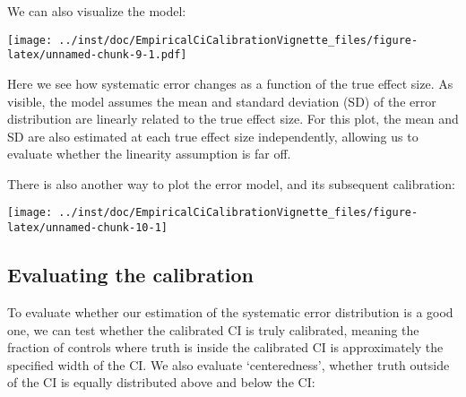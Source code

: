 \documentclass[
]{article}
\newenvironment{Shaded}{\begin{snugshade}}{\end{snugshade}}
\newcommand{\DataTypeTok}[1]{\textcolor[rgb]{0.13,0.29,0.53}{#1}}
\newcommand{\KeywordTok}[1]{\textcolor[rgb]{0.13,0.29,0.53}{\textbf{#1}}}
\newcommand{\NormalTok}[1]{#1}
\newcommand{\OperatorTok}[1]{\textcolor[rgb]{0.81,0.36,0.00}{\textbf{#1}}}
\begin{document}
We can also visualize the model:

\begin{Shaded}
\end{Shaded}

\texttt{[image: ../inst/doc/EmpiricalCiCalibrationVignette\_files/figure-latex/unnamed-chunk-9-1.pdf]}

Here we see how systematic error changes as a function of the true
effect size. As visible, the model assumes the mean and standard
deviation (SD) of the error distribution are linearly related to the
true effect size. For this plot, the mean and SD are also estimated at
each true effect size independently, allowing us to evaluate whether the
linearity assumption is far off.

There is also another way to plot the error model, and its subsequent
calibration:

\begin{Shaded}
\end{Shaded}

\texttt{[image: ../inst/doc/EmpiricalCiCalibrationVignette\_files/figure-latex/unnamed-chunk-10-1]}

\hypertarget{evaluating-the-calibration}{%
\subsection{Evaluating the
calibration}\label{evaluating-the-calibration}}

To evaluate whether our estimation of the systematic error distribution
is a good one, we can test whether the calibrated CI is truly
calibrated, meaning the fraction of controls where truth is inside the
calibrated CI is approximately the specified width of the CI. We also
evaluate `centeredness', whether truth outside of the CI is equally
distributed above and below the CI:

\begin{Shaded}
\end{Shaded}
\end{document}
